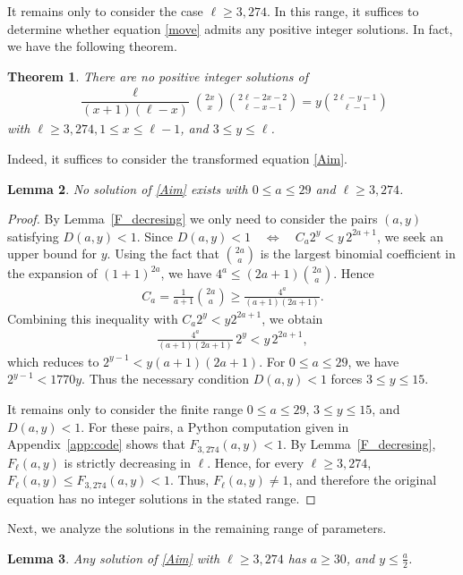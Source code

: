 \documentclass[11pt]{article}
\newtheorem{thm}{Theorem}[section]
\newtheorem{lem}[thm]{Lemma}
\begin{document}
It remains only to consider the case $\ell\ge 3{,}274$.
In this range, it suffices to determine whether equation \eqref{move}
admits any positive integer solutions. In fact, we have the following theorem.
\begin{thm}\label{Thm-last}
There are no positive integer solutions of
\begin{align*}
    \dfrac\ell{(x+1)(\ell-x)}\binom{2x}x\binom{2\ell-2x-2}{\ell-x-1}=y\binom{2\ell-y-1}{\ell-1}
\end{align*}
with $\ell\ge3{,}274, 1\le x\le\ell-1$, and $3\le y\le\ell$.
\end{thm}
Indeed, it suffices to consider the transformed equation \eqref{Aim}.
\begin{lem}\label{lem:no-solutions-large-l}
No solution of \eqref{Aim} exists with $0\le a\le29$ and $\ell\ge 3{,}274$.
\end{lem}
\begin{proof}
By Lemma~\ref{F_decresing} we only need to consider the pairs $(a,y)$ satisfying $D(a,y)<1$.
Since $D(a,y)<1
\quad\Longleftrightarrow\quad
C_a2^y<y\,2^{2a+1}$,
we seek an upper bound for $y$. Using the fact that $\binom{2a}{a}$ is the largest binomial
coefficient in the expansion of \((1+1)^{2a}\), we have
$4^a\le
(2a+1)\binom{2a}{a}$.
Hence
\begin{align*}
    C_a
=
\frac{1}{a+1}\binom{2a}{a}
\ge
\frac{4^a}{(a+1)(2a+1)}.
\end{align*}
Combining this inequality with \(C_a2^y<y2^{2a+1}\), we obtain
\begin{align*}
\frac{4^a}{(a+1)(2a+1)}\,2^y
<
y\,2^{2a+1},
\end{align*}
which reduces to
$2^{y-1}<y(a+1)(2a+1)$.
For $0\le a\le29$, we have
$2^{y-1}<1770y$.
Thus the necessary condition $D(a,y)<1$ forces $3\le y\le15$.

It remains only to consider the finite range
$0\leq a\leq29$, $3\leq y\leq15$, and $D(a,y)<1$. For these pairs, a
Python computation given in Appendix~\ref{app:code} shows that
$F_{3{,}274}(a,y)<1$. By Lemma~\ref{F_decresing},
$F_\ell(a,y)$ is strictly decreasing in $\ell$. Hence, for every
$\ell\ge 3{,}274$,
$F_\ell(a,y)\leq F_{3{,}274}(a,y)<1$.
Thus, $F_\ell(a,y)\neq1$, and therefore the original equation has no
integer solutions in the stated range.
\end{proof}

Next, we analyze the solutions in the remaining range of parameters.
\begin{lem}\label{lem-bound-a}
Any solution of \eqref{Aim} with $\ell \ge 3{,}274$ has
$a\ge30$, and $y\le\frac a2$.
\end{lem}
\end{document}
